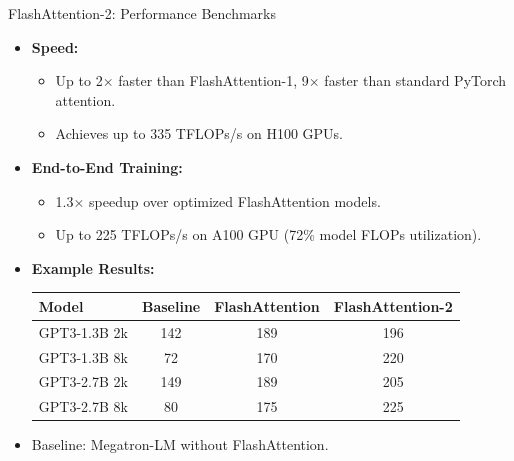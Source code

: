 \begin{frame}{FlashAttention-2: Performance Benchmarks}
    \begin{itemize}
        \item \textbf{Speed:}
        \begin{itemize}
            \item Up to 2$\times$ faster than FlashAttention-1, 9$\times$ faster than standard PyTorch attention.
            \item Achieves up to 335 TFLOPs/s on H100 GPUs.
        \end{itemize}
        \item \textbf{End-to-End Training:}
        \begin{itemize}
            \item 1.3$\times$ speedup over optimized FlashAttention models.
            \item Up to 225 TFLOPs/s on A100 GPU (72\% model FLOPs utilization).
        \end{itemize}
        \item \textbf{Example Results:}
            \begin{tabular}{lccc}
                \toprule
                Model & Baseline & FlashAttention & FlashAttention-2 \\
                \midrule
                GPT3-1.3B 2k & 142 & 189 & 196 \\
                GPT3-1.3B 8k & 72 & 170 & 220 \\
                GPT3-2.7B 2k & 149 & 189 & 205 \\
                GPT3-2.7B 8k & 80 & 175 & 225 \\
                \bottomrule
            \end{tabular}
        \item \footnotesize{Baseline: Megatron-LM without FlashAttention.}
    \end{itemize}
\end{frame}
